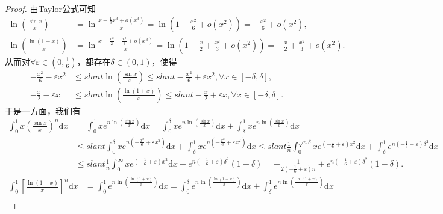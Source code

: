 \documentclass[../../main.tex]{subfiles}
\begin{document}
\begin{proof}
由Taylor公式可知
\begin{align*}
\ln \left( \frac{\sin x}{x} \right) &=\ln \frac{x-\frac{1}{6}x^3+o\left( x^3 \right)}{x}=\ln \left( 1-\frac{x^2}{6}+o\left( x^2 \right) \right) =-\frac{x^2}{6}+o\left( x^2 \right) ,\\
\ln \left( \frac{\ln \left( 1+x \right)}{x} \right) &=\ln \frac{x-\frac{x^2}{2}+\frac{x^3}{3}+o\left( x^3 \right)}{x}=\ln \left( 1-\frac{x}{2}+\frac{x^2}{3}+o\left( x^2 \right) \right) =-\frac{x}{2}+\frac{x^2}{3}+o\left( x^2 \right) .
\end{align*}
从而对$\forall \varepsilon \in \left( 0,\frac{1}{6} \right)$，都存在$\delta \in (0,1)$，使得
\begin{align*}
-\frac{x^2}{6}-\varepsilon x^2&\leqslant slant \ln \left( \frac{\sin x}{x} \right) \leqslant slant -\frac{x^2}{6}+\varepsilon x^2,\forall x\in [-\delta ,\delta ] ,\\
-\frac{x}{2}-\varepsilon x&\leqslant slant \ln \left( \frac{\ln \left( 1+x \right)}{x} \right) \leqslant slant -\frac{x}{2}+\varepsilon x,\forall x\in [-\delta ,\delta ] .
\end{align*}
于是一方面，我们有
\begin{align*}
\int_0^1{x\left( \frac{\sin x}{x} \right) ^n\mathrm{d}x}&=\int_0^1{xe^{n\ln \left( \frac{\sin x}{x} \right)}\mathrm{d}x}=\int_0^{\delta}{xe^{n\ln \left( \frac{\sin x}{x} \right)}\mathrm{d}x}+\int_{\delta}^1{xe^{n\ln \left( \frac{\sin x}{x} \right)}\mathrm{d}x}\\
&\leqslant slant \int_0^{\delta}{xe^{n\left( -\frac{x^2}{6}+\varepsilon x^2 \right)}\mathrm{d}x}+\int_{\delta}^1{xe^{n\left( -\frac{x^2}{6}+\varepsilon x^2 \right)}\mathrm{d}x}\leqslant slant \frac{1}{n}\int_0^{\sqrt{n}\delta}{xe^{\left( -\frac{1}{6}+\varepsilon \right) x^2}\mathrm{d}x}+\int_{\delta}^1{e^{n\left( -\frac{1}{6}+\varepsilon \right) \delta ^2}\mathrm{d}x}\\
&\leqslant slant \frac{1}{n}\int_0^{\infty}{xe^{\left( -\frac{1}{6}+\varepsilon \right) x^2}\mathrm{d}x}+e^{n\left( -\frac{1}{6}+\varepsilon \right) \delta ^2}\left( 1-\delta \right) =-\frac{1}{2\left( -\frac{1}{6}+\varepsilon \right) n}+e^{n\left( -\frac{1}{6}+\varepsilon \right) \delta ^2}\left( 1-\delta \right) .
\end{align*}
\begin{align*}
\int_0^1{\left[ \frac{\ln \left( 1+x \right)}{x} \right] ^n\mathrm{d}x}&=\int_0^1{e^{n\ln \left( \frac{\ln \left( 1+x \right)}{x} \right)}\mathrm{d}x}=\int_0^{\delta}{e^{n\ln \left( \frac{\ln \left( 1+x \right)}{x} \right)}\mathrm{d}x}+\int_{\delta}^1{e^{n\ln \left( \frac{\ln \left( 1+x \right)}{x} \right)}\mathrm{d}x}\\

\end{align*}
\end{proof}
\end{document}
